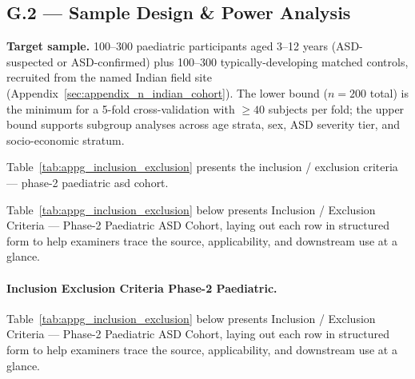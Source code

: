 \subsection*{G.2 --- Sample Design \& Power Analysis}
\label{subsec:appg_sample_design}

\noindent\textbf{Target sample.} 100--300 paediatric participants aged 3--12 years (ASD-suspected or ASD-confirmed) plus 100--300 typically-developing matched controls, recruited from the named Indian field site (Appendix~\ref{sec:appendix_n_indian_cohort}). The lower bound ($n=200$ total) is the minimum for a 5-fold cross-validation with $\geq 40$ subjects per fold; the upper bound supports subgroup analyses across age strata, sex, ASD severity tier, and socio-economic stratum.

{\tablestripes\tablefontsize

\noindent Table~\ref{tab:appg_inclusion_exclusion} presents the inclusion / exclusion criteria --- phase-2 paediatric asd cohort.


\noindent Table~\ref{tab:appg_inclusion_exclusion} below presents Inclusion / Exclusion Criteria --- Phase-2 Paediatric ASD Cohort, laying out each row in structured form to help examiners trace the source, applicability, and downstream use at a glance. %
\paragraph{Inclusion Exclusion Criteria Phase-2 Paediatric.} %
\noindent Table~\ref{tab:appg_inclusion_exclusion} below presents Inclusion / Exclusion Criteria --- Phase-2 Paediatric ASD Cohort, laying out each row in structured form to help examiners trace the source, applicability, and downstream use at a glance. %



}
